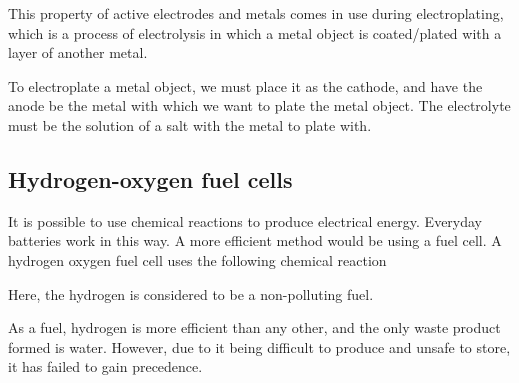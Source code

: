 This property of active electrodes and metals comes in use during electroplating, which is a
process of electrolysis in which a metal object is coated/plated with a layer of another metal.

To electroplate a metal object, we must place it as the cathode, and have the anode be the metal with
which we want to plate the metal object. The electrolyte must be the solution of a salt with the
metal to plate with.

\subsection{Hydrogen-oxygen fuel cells}

It is possible to use chemical reactions to produce electrical energy. Everyday batteries work in
this way. A more efficient method would be using a fuel cell. A hydrogen oxygen fuel cell uses
the following chemical reaction

\begin{center}
\end{center}
Here, the hydrogen is considered to be a non-polluting fuel. 

As a fuel, hydrogen is more efficient than any other, and the only waste product formed is water.
However, due to it being difficult to produce and unsafe to store, it has failed to gain precedence.
